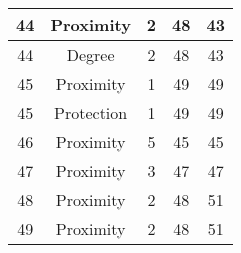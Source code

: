 \documentclass[results.tex]{subfiles}
\begin{document}
\begin{center}
\begin{tabular}{| c || c | c | c | c |}
    \hline
    44 & Proximity & 2 & 48 & 43 \\ 
    \hline
    44 & Degree & 2 & 48 & 43 \\ 
    \hline
    45 & Proximity & 1 & 49 & 49 \\ 
    \hline
    45 & Protection & 1 & 49 & 49 \\ 
    \hline
    46 & Proximity & 5 & 45 & 45 \\ 
    \hline
    47 & Proximity & 3 & 47 & 47 \\ 
    \hline
    48 & Proximity & 2 & 48 & 51 \\ 
    \hline
    49 & Proximity & 2 & 48 & 51 \\ 
    \hline   \end{tabular}
\end{center}
\end{document}
